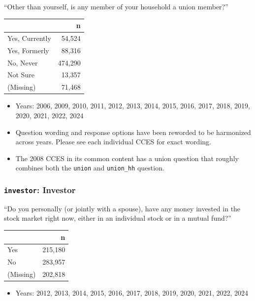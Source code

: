 \documentclass[10pt,article,oneside]{memoir}
\begin{document}
``Other than yourself, is any member of your household a union member?''

\begin{table}[H]
\centering
\begin{tabular}[t]{lr}
\toprule
 & n\\
\midrule
Yes, Currently & 54,524\\
Yes, Formerly & 88,316\\
No, Never & 474,290\\
Not Sure & 13,357\\
(Missing) & 71,468\\
\bottomrule
\end{tabular}
\end{table}

\begin{itemize}
\tightlist
\item
  Years: 2006, 2009, 2010, 2011, 2012, 2013, 2014, 2015, 2016, 2017,
  2018, 2019, 2020, 2021, 2022, 2024
\item
  Question wording and response options have been reworded to be
  harmonized across years. Please see each individual CCES for exact
  wording.
\item
  The 2008 CCES in its common content has a union question that roughly
  combines both the \texttt{union} and \texttt{union\_hh} question.
\end{itemize}

\subsubsection{\texorpdfstring{\texttt{investor}:
Investor}{investor: Investor}}\label{investor-investor}

``Do you personally (or jointly with a spouse), have any money invested
in the stock market right now, either in an individual stock or in a
mutual fund?''

\begin{table}[H]
\centering
\begin{tabular}[t]{lr}
\toprule
 & n\\
\midrule
Yes & 215,180\\
No & 283,957\\
(Missing) & 202,818\\
\bottomrule
\end{tabular}
\end{table}

\begin{itemize}
\tightlist
\item
  Years: 2012, 2013, 2014, 2015, 2016, 2017, 2018, 2019, 2020, 2021,
  2022, 2024
\end{itemize}
\end{document}
